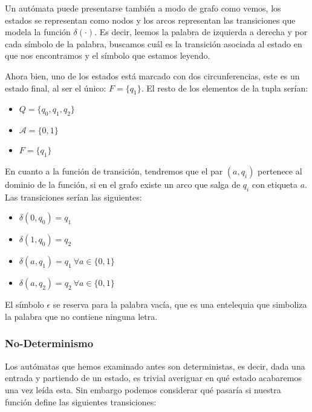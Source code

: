 Un autómata puede presentarse también a modo de grafo como vemos, los estados se representan como nodos y los arcos representan las transiciones que modela la función $\delta(\cdot)$. Es decir, leemos la palabra de izquierda a derecha y por cada símbolo de la palabra, buscamos cuál es la transición asociada al estado en que nos encontramos y el símbolo que estamos leyendo.

\vspace{10px}

Ahora bien, uno de los estados está marcado con dos circunferencias, este es un estado final, al ser el único: $F = \{q_1\}$. El resto de los elementos de la tupla serían:

\begin{multicols}{2}
	\begin{itemize}
		\item $Q =\{q_0,q_1,q_2\}$
		\item $\mathcal{A} = \{0,1\}$
		\item $F = \{q_1\}$
	\end{itemize}
	
\end{multicols}

En cuanto a la función de transición, tendremos que el par $(a,q_i)$ pertenece al dominio de la función, si en el grafo existe un arco que salga de $q_i$ con etiqueta $a$. Las transiciones serían las siguientes:

\begin{multicols}{2}
	\begin{itemize}
		\item $\delta(0,q_0)=q_1$
		\item $\delta(1,q_0)=q_2$
		\item $\delta(a,q_1)=q_1 \ \forall a \in \{0,1\}$
		\item $\delta(a,q_2)=q_2 \ \forall a \in \{0,1\}$
	\end{itemize}
\end{multicols}

El símbolo $\epsilon$ se reserva para la palabra vacía, que es una entelequia que simboliza la palabra que no contiene ninguna letra.





\subsubsection{No-Determinismo}

Los autómatas que hemos examinado antes son deterministas, es decir, dada una entrada y partiendo de un estado, es trivial averiguar en qué estado acabaremos una vez leída esta. Sin embargo podemos considerar qué pasaría si nuestra función define las siguientes transiciones:

